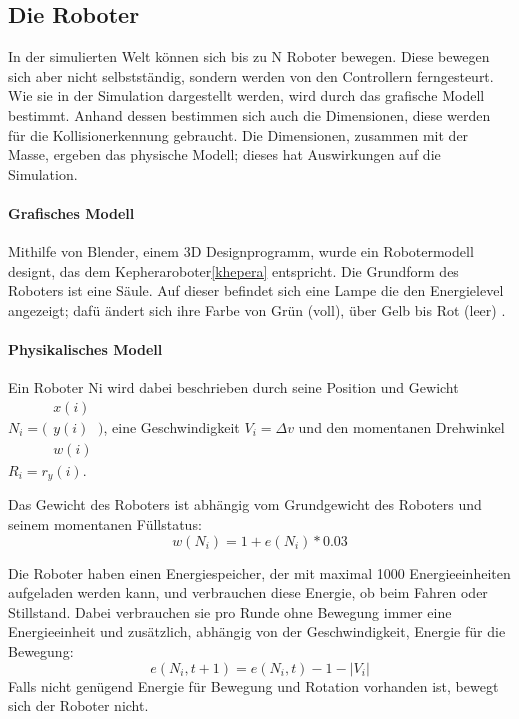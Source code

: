 \subsection{Die Roboter}\label{robot}
In der simulierten Welt k{\"{o}}nnen sich bis zu \gls{N} Roboter bewegen. Diese bewegen sich aber nicht selbstst{\"{a}}ndig, sondern werden von den Controllern ferngesteurt.
Wie sie in der Simulation dargestellt werden, wird durch das grafische Modell bestimmt. Anhand dessen bestimmen sich auch die Dimensionen, diese werden f{\"{u}}r die Kollisionerkennung
gebraucht. Die Dimensionen, zusammen mit der Masse, ergeben das physische Modell; dieses hat Auswirkungen auf die Simulation.

\paragraph{Grafisches Modell} Mithilfe von Blender, einem 3D Designprogramm, wurde ein Robotermodell designt, das dem Kepheraroboter\ref{khepera} entspricht. Die Grundform des Roboters ist
eine S{\"{a}}ule. Auf dieser befindet sich eine Lampe die den Energielevel angezeigt; daf{\"{u}} {\"{a}}ndert sich ihre Farbe von Gr{\"{u}}n (voll), {\"{u}}ber Gelb bis Rot (leer) .


\paragraph{Physikalisches Modell}
Ein Roboter \gls{Ni} wird dabei beschrieben durch seine Position und Gewicht
$ N_i = \bigl(\begin{smallmatrix} x(i) \\ y(i) \\ w(i) \end{smallmatrix}\bigr)$, eine
Geschwindigkeit $ V_i = \Delta v $ und den momentanen Drehwinkel
$ R_i = r_y(i)$. 

Das Gewicht des Roboters ist abh{\"{a}}ngig vom Grundgewicht des Roboters und seinem momentanen F{\"{u}}llstatus: 
\begin{equation}\label{eq:w}
 w(N_i) = 1 + e(N_i) * 0.03
\end{equation}

Die Roboter haben einen Energiespeicher, der mit maximal 1000 Energieeinheiten
aufgeladen werden kann, und verbrauchen diese Energie, ob beim Fahren oder
Stillstand. Dabei verbrauchen sie pro Runde ohne Bewegung immer eine Energieeinheit und zus{\"{a}}tzlich, abh{\"{a}}ngig von der Geschwindigkeit, Energie f{\"{u}}r die Bewegung:
\begin{equation}\label{eq:entladen}
	e(N_i, t + 1) = e(N_i, t) - 1 - |V_i|
\end{equation}
Falls nicht gen{\"{u}}gend Energie f{\"{u}}r Bewegung und Rotation vorhanden ist, bewegt sich der Roboter nicht.

